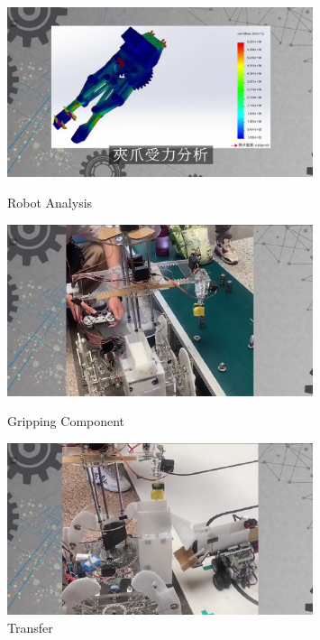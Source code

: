 \documentclass[10pt, letterpaper]{article}
\begin{document}
\begin{figure}[htbp]
        \vspace{1.6cm}

        \begin{minipage}[c]{0.33\linewidth}
            \centering
            \includegraphics[width=0.8\textwidth]{fig/Robot Design/夾爪受力分析.png}
            \caption{Robot Analysis}
        \end{minipage}
        \begin{minipage}[c]{0.33\linewidth}
            \centering
            \includegraphics[width=0.8\textwidth]{fig/Robot Design/夾取物品.png}
            \caption{Gripping Component}
        \end{minipage}%
        \begin{minipage}[c]{0.33\linewidth}
            \centering
            \includegraphics[width=0.8\textwidth]{fig/Robot Design/物品交接.png}
            \caption{Transfer}
        \end{minipage}            


\end{figure}
\end{document}
